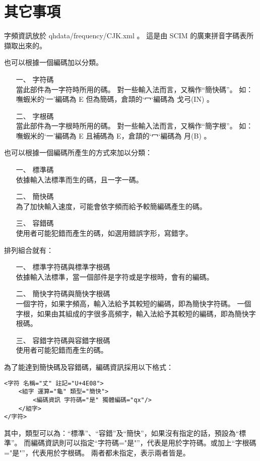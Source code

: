 \chapter{其它事項}
字頻資訊放於 qhdata/frequency/CJK.xml 。
這是由 SCIM 的廣東拼音字碼表所擷取出來的。


也可以根據一個編碼加以分類。
\begin{enumerate}
\item[一、]字符碼\\
當此部件為一字符時所用的碼。
對一些輸入法而言，又稱作``簡快碼''。
如：嘸蝦米的`一'編碼為 E 但為簡碼，倉頡的`冖‘編碼為 戈弓(IN) 。
\item[二、]字根碼\\
當此部件為一字根時所用的碼。
對一些輸入法而言，又稱作``簡字根''。
如：嘸蝦米的`一'編碼為 E 且補碼為 E，倉頡的`冖‘編碼為 月(B) 。
\end{enumerate}

也可以根據一個編碼所產生的方式來加以分類：
\begin{enumerate}
\item[一、]標準碼\\
依據輸入法標準而生的碼，且一字一碼。
\item[二、]簡快碼\\
為了加快輸入速度，可能會依字頻而給予較簡編碼產生的碼。 
\item[三、]容錯碼\\
使用者可能犯錯而產生的碼，如選用錯誤字形，寫錯字。
\end{enumerate}

排列組合就有：
\begin{enumerate}
\item[一、]標準字符碼與標準字根碼\\
依據輸入法標準，當一個部件是字符或是字根時，會有的編碼。
\item[二、]簡快字符碼與簡快字根碼\\
一個字符，如果字頻高，輸入法給予其較短的編碼，即為簡快字符碼。
一個字根，如果由其組成的字很多高頻字，輸入法給予其較短的編碼，即為簡快字根碼。
\item[三、]容錯字符碼與容錯字根碼\\
使用者可能犯錯而產生的碼。
\end{enumerate}

為了能達到簡快碼及容錯碼，編碼資訊採用以下格式：
\listXML\begin{lstlisting}
<字符 名稱="丈" 註記="U+4E08">
	<組字 運算="龜" 類型="簡快">
		<編碼資訊 字符碼="是" 獨體編碼="qx"/>
	</組字>
</字符>
\end{lstlisting}

其中，類型可以為：``標準''、``容錯''及``簡快''，如果沒有指定的話，預設為``標準''。
而編碼資訊則可以指定``字符碼="是"''，代表是用於字符碼。或加上``字根碼="是"''，代表用於字根碼。
兩者都未指定，表示兩者皆是。

